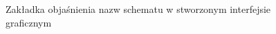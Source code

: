 \begin{figure}[ht!]
  \centering
  \caption{Zakładka objaśnienia nazw schematu w stworzonym interfejsie graficznym}
  \label{fig:gui-clarification-tab}
\end{figure}

